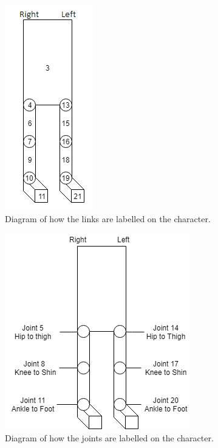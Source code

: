 \documentclass[12pt, a4paper]{article}
\begin{document}
\begin{figure}
\begin{center}
\includegraphics[scale=0.8]{link_labels}
\caption{Diagram of how the links are labelled on the character.}
\label{fig: link labels}
\end{center}
\end{figure}

\begin{figure}
\begin{center}
\includegraphics[scale=0.8]{joint_labels}
\caption{Diagram of how the joints are labelled on the character.}
\label{fig: joint labels}
\end{center}
\end{figure}
\end{document}
